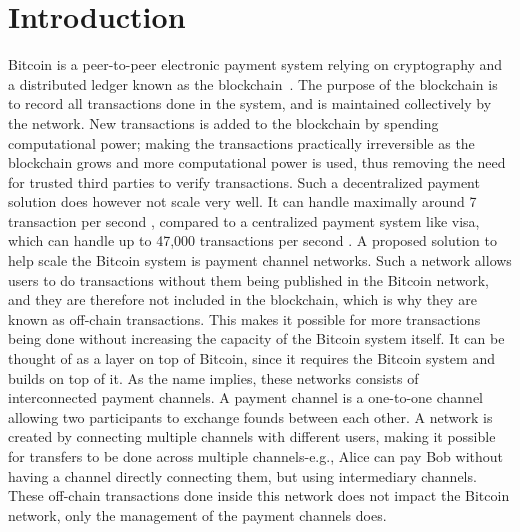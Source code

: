\chapter{Introduction}
\label{chap:introduction}

Bitcoin is a peer-to-peer electronic payment system relying on cryptography and a distributed ledger known as the blockchain~\cite{nakamoto2008bitcoin}. 
The purpose of the blockchain is to record all transactions done in the system, and is maintained collectively by the network. New transactions is added to the blockchain by spending computational power; making the transactions practically irreversible as the blockchain grows and more computational power is used, thus removing the need for trusted third parties to verify transactions. Such a decentralized payment solution does however not scale very well. It can handle maximally around 7 transaction per second \cite{poon2015bitcoin}, compared to a centralized payment system like visa, which can handle up to 47,000 transactions per second \cite{visa_stress}.
A proposed solution to help scale the Bitcoin system is payment channel networks. Such a network allows users to do transactions without them being published in the Bitcoin network, and they are therefore not included in the blockchain, which is why they are known as off-chain transactions. This makes it possible for more transactions being done without increasing the capacity of the Bitcoin system itself. It can be thought of as a layer on top of Bitcoin, since it requires the Bitcoin system and builds on top of it. As the name implies, these networks consists of interconnected payment channels. A payment channel is a one-to-one channel allowing two participants to exchange founds between each other. A network is created by connecting multiple channels with different users, making it possible for transfers to be done across multiple channels-e.g., Alice can pay Bob without having a channel directly connecting them, but using intermediary channels. These off-chain transactions done inside this network does not impact the Bitcoin network, only the management of the payment channels does.
\\ 

